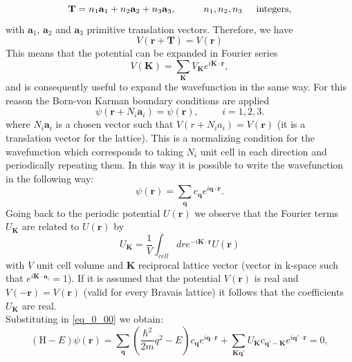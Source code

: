 \begin{equation}
    \mathbf{T}=n_1\mathbf{a}_1+n_2\mathbf{a}_2+n_3\mathbf{a}_3,\hspace{1cm}n_1,n_2,n_3\hspace{0.5cm}\mathrm{integers},
\end{equation}
with $\mathbf{a}_1$, $\mathbf{a}_2$ and $\mathbf{a}_3$ primitive translation vectors.
Therefore, we have
\begin{equation}
    V(\mathbf{r}+\mathbf{T})=V(\mathbf{r})
\end{equation}
This means that the potential can be expanded in Fourier series
\begin{equation}
    V(\mathbf{K})=\sum_\mathbf{K}V_\mathbf{K}e^{i\mathbf{K}\cdot \mathbf{r}},
\end{equation}
and is consequently useful to expand the wavefunction in the same way. For this reason the Born-von Karman boundary conditions
are applied \cite{Ashcroft76}
\begin{equation}
    \psi(\mathbf{r}+N_i\mathbf{a}_i)=\psi(\mathbf{r}),\hspace{1cm}i=1,2,3.
\end{equation}
where $N_i\mathbf{a}_i$ is a chosen vector such that $V(r+N_ia_i)=V(\mathbf{r})$ (it is a translation vector for the lattice). This is a normalizing
condition for the wavefunction which corresponds to taking $N_i$ unit cell in each direction and periodically repeating them. In this 
way it is possible to write the wavefunction in the following way:
\begin{equation}
    \psi(\mathbf{r})=\sum_\mathbf{q}c_\mathbf{q}e^{i\mathbf{q}\cdot\mathbf{r}}.
    \label{eq_0_01}
\end{equation}
Going back to the periodic potential $U(\mathbf{r})$ we observe that the Fourier terms $U_\mathbf{K}$ are related to $U(\mathbf{r})$ by
\begin{equation}
    U_\mathbf{K}=\frac{1}{V}\int_{cell}dre^{-i\mathbf{K}\cdot\mathbf{r}}U(\mathbf{r})
\end{equation}
with $V$ unit cell volume and $\mathbf{K}$ reciprocal lattice vector (vector in k-space such that $e^{i\mathbf{K}\cdot \mathbf{a}_i}=1$). If it is 
assumed that the potential $V(\mathbf{r})$ is real and $V(-\mathbf{r})=V(\mathbf{r})$ (valid for every Bravais lattice) it follows that the coefficients 
$U_\mathbf{K}$ are real.\\
Substituting in \ref{eq_0_00} we obtain:
\begin{equation}
    (\mathrm{H}-E)\psi(\mathbf{r})=\sum_\mathbf{q}\left(\frac{\hbar^2}{2m}q^2-E\right)c_\mathbf{q}e^{i\mathbf{q}\cdot\mathbf{r}}+\sum_{\mathbf{K}\mathbf{q}'}U_\mathbf{K}c_{\mathbf{q}'-\mathbf{K}}e^{i\mathbf{q}'\cdot\mathbf{r}}=0,
\end{equation}
